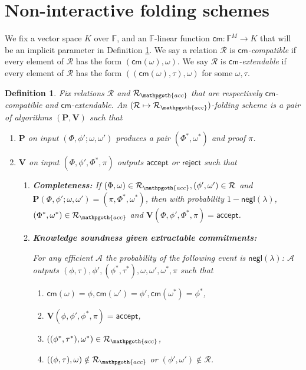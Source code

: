 \documentclass[11pt]{article} %
\newcommand{\F}{\ensuremath{\mathbb F}\xspace}
\newcommand{\adv}{\ensuremath{\mathcal A}\xspace}
\newcommand{\cm}{\ensuremath{\mathsf{cm}}\xspace}
\newcommand{\negl}{\ensuremath{\mathsf{negl}(\lambda)}\xspace}
\newcommand{\rej}{\ensuremath{\mathsf{reject}}\xspace}
\newcommand{\acc}{\ensuremath{\mathsf{accept}}\xspace}
\newcommand{\prv}{\ensuremath{\mathsf{\mathbf{P}}}\xspace}
\newcommand{\prf}{\ensuremath{\mathsf{\pi}}\xspace}
\newcommand{\inst}{\ensuremath{\phi}\xspace}
\newcommand{\wit}{\ensuremath{\mathsf{\omega}}\xspace}
\newcommand{\ver}{\ensuremath{\mathsf{\mathbf{V}}}\xspace}
\newcommand{\rel}{\ensuremath{\mathcal{R}}\xspace}
\newtheorem{dfn}[lemma]{Definition}
\newcommand{\instt}{\ensuremath{\Phi^*}\xspace}
\newcommand{\insttbase}{\ensuremath{\Phi}\xspace}
\newcommand{\accscheme}[2]{$(#1\mapsto #2)$-folding scheme\xspace}
\newcommand{\accrel}{\ensuremath{\rel_{\mathpgoth{acc}}}\xspace}
\newcommand{\inststar}{\ensuremath{\inst^*}\xspace}
\newcommand{\witstar}{\ensuremath{\wit^*}\xspace}
\begin{document}
\section{Non-interactive folding schemes}\label{sec:folding}
We fix a vector space $K$ over \F, and an $\F$-linear function $\cm:\F^M\to K$ that will be an implicit parameter in Definition \ref{dfn:accschme}.
We say a relation \rel is \emph{\cm-compatible} if every element of \rel has the form $(\cm(\wit),\wit)$.
We say \rel is \emph{\cm-extendable} if every element of \rel has the form $((\cm(\wit),\tau),\wit)$ for some $\wit,\tau$.
\begin{dfn}\label{dfn:accschme}
Fix relations \rel and \accrel that are respectively \cm-compatible and \cm-extendable. An \emph{\accscheme{\rel}{\accrel}} is a pair of algorithms $(\prv, \ver)$
such that

\begin{enumerate}
 \item \prv on input $(\insttbase,\inst';\wit,\wit')$ produces a pair $(\instt,\wit^*)$ and proof \prf .
 \item \ver on input $(\insttbase,\inst',\instt,\prf)$ outputs \acc or \rej such that
\begin{enumerate}
 \item \textbf{Completeness:} If $(\insttbase,\wit)\in \accrel, (\inst',\wit')\in \rel$ and $\prv(\insttbase,\inst';\wit,\wit')=(\prf,\instt,\witstar)$, then with probability $1-\negl$, $(\instt,\witstar)\in \accrel$ and $\ver(\insttbase,\inst',\instt,\prf)=\acc$.
\item \textbf{Knowledge soundness  given extractable commitments:}

For any efficient \adv the probability of the following event is \negl:
\adv outputs $(\inst,\tau),\inst',(\inststar,\tau^*),\wit,\wit',\witstar,\prf$
such that 
\begin{enumerate}
\item $\cm(\wit)=\inst,\cm(\wit')=\inst',\cm(\witstar)=\inststar$, 
\item $\ver(\inst,\inst',\inststar,\prf)=\acc$,
\item $((\inststar,\tau^*),\witstar)\in\accrel$, 
\item $((\inst,\tau),\wit)\notin\accrel$ or $(\inst',\wit')\notin \rel$.
\end{enumerate}

\end{enumerate}
\end{enumerate}
\end{dfn}
\end{document}
